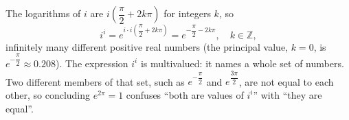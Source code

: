 The logarithms of $i$ are $i\left(\dfrac\pi2+2k\pi\right)$ for integers $k$, so
\[i^i=e^{i\cdot i\left(\dfrac\pi2+2k\pi\right)}=\boxed{e^{-\dfrac\pi2-2k\pi}},\quad k\in\mathbb Z,\]
infinitely many different positive real numbers (the principal value, $k=0$, is $e^{-\dfrac\pi2}\approx0.208$). The expression $i^i$ is multivalued: it names a whole set of numbers. Two different members of that set, such as $e^{-\dfrac\pi2}$ and $e^{\dfrac{3\pi}{2}}$, are not equal to each other, so concluding $e^{2\pi}=1$ confuses ``both are values of $i^i$'' with ``they are equal''.
